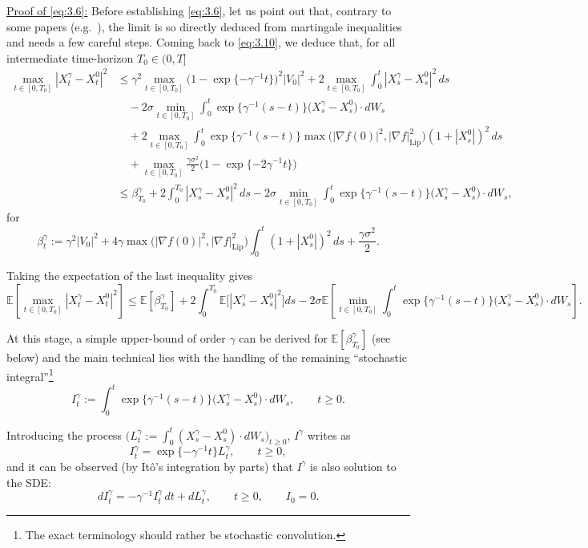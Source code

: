 \documentclass[11pt]{article}
\theoremstyle{remark}
\begin{document}
\underline{Proof of \eqref{eq:3.6}:}
Before establishing \eqref{eq:3.6}, let us point out that, contrary to some papers (e.g.~\cite{f04}), the limit is so directly deduced from martingale inequalities and needs a few careful steps.
Coming back to \eqref{eq:3.10}, we deduce that, for all intermediate time-horizon $T_0\in(0,T]$
\[
\begin{aligned}
\max_{t\in[0,T_0]}|X_t^{\gamma}-X_t^0|^2
&\le \gamma^2\max_{t\in[0,T_0]}\bigl(1-\exp\{-\gamma^{-1}t\}\bigr)^2|V_0|^2+2\max_{t\in[0,T_0]}\int_0^t |X_s^{\gamma}-X_s^0|^2\,ds \\
&\quad -2\sigma\min_{t\in[0,T_0]}\int_0^t \exp\{\gamma^{-1}(s-t)\}\bigl(X_s^{\gamma}-X_s^0\bigr)\cdot dW_s \\
&\quad +2\max_{t\in[0,T_0]}\int_0^t \exp\{\gamma^{-1}(s-t)\}\max\bigl(|\nabla f(0)|^2,|\nabla f|_{\mathrm{Lip}}^2\bigr)(1+|X_s^0|)^2\,ds \\
&\quad +\max_{t\in[0,T_0]}\frac{\gamma\sigma^2}{2}\bigl(1-\exp\{-2\gamma^{-1}t\}\bigr) \\
&\le \beta_{T_0}^{\gamma}+2\int_0^{T_0}|X_s^{\gamma}-X_s^0|^2\,ds-2\sigma\min_{t\in[0,T_0]}\int_0^t \exp\{\gamma^{-1}(s-t)\}\bigl(X_s^{\gamma}-X_s^0\bigr)\cdot dW_s,
\end{aligned}
\]
for
\[
\beta_t^{\gamma}:=\gamma^2|V_0|^2+4\gamma\max\bigl(|\nabla f(0)|^2,|\nabla f|_{\mathrm{Lip}}^2\bigr)\int_0^t (1+|X_s^0|)^2\,ds+\frac{\gamma\sigma^2}{2}.
\]

Taking the expectation of the last inequality gives
\[
\mathbb{E}\left[\max_{t\in[0,T_0]}|X_t^{\gamma}-X_t^0|^2\right]\le \mathbb{E}[\beta_{T_0}^{\gamma}]+2\int_0^{T_0}\mathbb{E}\bigl[|X_s^{\gamma}-X_s^0|^2\bigr]ds-2\sigma\mathbb{E}\left[\min_{t\in[0,T_0]}\int_0^t \exp\{\gamma^{-1}(s-t)\}\bigl(X_s^{\gamma}-X_s^0\bigr)\cdot dW_s\right].
\]

At this stage, a simple upper-bound of order $\gamma$ can be derived for $\mathbb{E}[\beta_{T_0}^{\gamma}]$ (see below) and the main technical lies with the handling of the remaining ``stochastic integral''\footnote{The exact terminology should rather be stochastic convolution.}
\[
I_t^{\gamma}:=\int_0^t \exp\{\gamma^{-1}(s-t)\}\bigl(X_s^{\gamma}-X_s^0\bigr)\cdot dW_s,\qquad t\ge 0.
\]


Introducing the process $\bigl(L_t^{\gamma}:=\int_0^t (X_s^{\gamma}-X_s^0)\cdot dW_s\bigr)_{t\ge0}$, $I^{\gamma}$ writes as
\[
I_t^{\gamma}=\exp\{-\gamma^{-1}t\}L_t^{\gamma},\qquad t\ge0,
\]
and it can be observed (by It\^o's integration by parts) that $I^{\gamma}$ is also solution to the SDE:
\[
dI_t^{\gamma}=-\gamma^{-1}I_t^{\gamma}\,dt+dL_t^{\gamma},\qquad t\ge0,\qquad I_0=0.
\]
\end{document}
